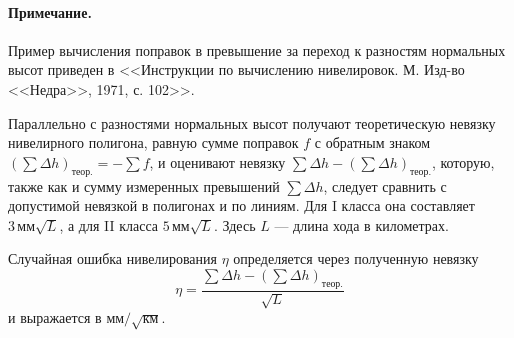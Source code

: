 \documentclass[11pt, a4paper,addpoints]{exam}
\theoremstyle{remark}
\begin{document}
\begin{questions}
    \paragraph{Примечание.} Пример вычисления поправок в превышение за переход к разностям нормальных высот приведен в
    <<Инструкции по вычислению нивелировок. М. Изд-во <<Недра>>, 1971, с. 102>>.

    Параллельно с разностями нормальных высот получают теоретическую невязку нивелирного полигона,
    равную сумме поправок $f$ с обратным знаком $(\sum\Delta h)_\textrm{теор.} =  -\sum f$, и
    оценивают невязку $\sum\Delta h - (\sum\Delta h)_\textrm{теор.}$, которую, также как и сумму
    измеренных превышений $\sum\Delta h$, следует сравнить с 
    допустимой невязкой в полигонах и по линиям. Для I класса она составляет 
    $3\,\textrm{мм}\sqrt{L}$, 
    а для II класса $5\,\textrm{мм}\sqrt{L}$. Здесь $L$ --- длина хода в километрах.

    Случайная ошибка нивелирования $\eta$ определяется через полученную невязку
    \begin{equation*}
        \eta = \dfrac{\sum\Delta h - (\sum\Delta h)_\textrm{теор.}}{\sqrt{L}}
    \end{equation*}
    и выражается в $\textrm{мм} / \sqrt{\textrm{км}}$.
\end{questions}

\end{document}
